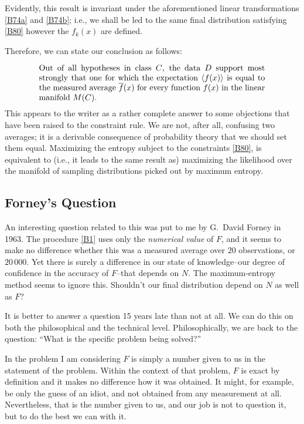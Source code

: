 {Evidently, this result is invariant under the aforementioned linear transformations \eqref{B74a} and \eqref{B74b}; i.e., we shall be led to the same final distribution satisfying \eqref{B80} however the $f_k(x)$ are defined.

Therefore, we can state our conclusion as follows:

\begin{equation}
	\label{B82}
	\parbox{0.8\linewidth}{%
		Out of all hypotheses in class $C$, the data $D$ support most strongly that one for which the expectation $\mean{f(x)}$ is equal to the measured average $\overline{f}(x)$ for every function $f(x)$ in the linear manifold $M(C)$.}
\end{equation}
This appears to the writer as a rather complete answer to some objections that have been raised to the constraint rule.
We are not, after all, confusing two averages; it is a derivable consequence of probability theory that we should set them equal.
Maximizing the entropy subject to the constraints \eqref{B80}, is equivalent to (i.e., it leads to the same result as) maximizing the likelihood over the manifold of sampling distributions picked out by maximum entropy.

\subsection{Forney's Question}
An interesting question related to this was put to me by G.~David Forney in 1963.
The procedure \eqref{B1} uses only the \emph{numerical value} of $F$, and it seems to make no difference whether this was a measured average over $20$ observations, or $20\,000$.
Yet there is surely a difference in our state of knowledge--our degree of confidence in the accuracy of $F$--that depends on $N$.
The maximum-entropy method seems to ignore this.
Shouldn't our final distribution depend on $N$ as well as $F$?

It is better to answer a question 15 years late than not at all.
We can do this on both the philosophical and the technical level.
Philosophically, we are back to the question: ``What is the specific problem being solved?''

In the problem I am considering $F$ is simply a number given to us in the statement of the problem.
Within the context of that problem, $F$ is exact by definition and it makes no difference how it was obtained.
It might, for example, be only the guess of an idiot, and not obtained from any measurement at all.
Nevertheless, that is the number given to us, and our job is not to question it, but to do the best we can with it.

}
